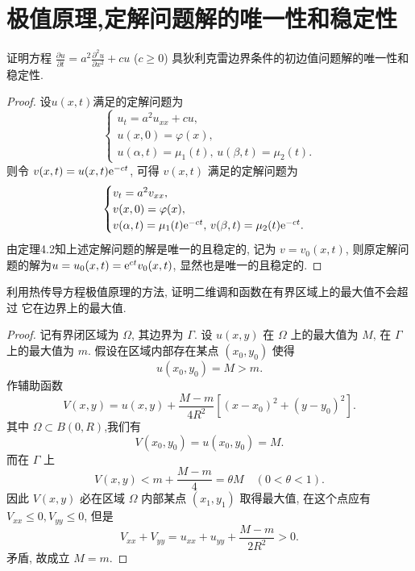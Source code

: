 \section{极值原理,定解问题解的唯一性和稳定性}

\begin{exercise}
  证明方程 $\frac{\partial u}{\partial t} = a^2 \frac{\partial^2 u}{\partial x^2} + cu$
  ($c\geq 0$) 具狄利克雷边界条件的初边值问题解的唯一性和稳定性.
\end{exercise}

\begin{proof}
  设$u(x,t)$满足的定解问题为
  \[\begin{cases}
    u_t = a^2 u_{xx} + cu, \\
    u(x,0) = \varphi(x), \\
    u(\alpha,t) = \mu_1(t),\,u(\beta,t)=\mu_2(t).
  \end{cases}\]
  则令 $v(x,t)=u(x,t) \mathrm{e}^{-ct}$, 可得 $v(x,t)$ 满足的定解问题为
  \[\begin{cases}
    v_t = a^2v_{xx}, \\
    v(x,0) = \varphi(x), \\
    v(\alpha,t) = \mu_1(t)\mathrm{e}^{-ct},\,v(\beta,t) = \mu_2(t)\mathrm{e}^{-ct}.
  \end{cases}\]
  由定理4.2知上述定解问题的解是唯一的且稳定的,
  记为 $v=v_0(x,t)$, 则原定解问题的解为$u = u_0(x,t) = \mathrm{e}^{ct}v_0(x,t)$, 显然也是唯一的且稳定的.
\end{proof}


\begin{exercise}
  利用热传导方程极值原理的方法, 证明二维调和函数在有界区域上的最大值不会超过
  它在边界上的最大值.
\end{exercise}

\begin{proof}
  记有界闭区域为 $\Omega$, 其边界为 $\Gamma$.
  设 $u(x,y)$ 在 $\Omega$ 上的最大值为 $M$, 在 $\Gamma$ 上的最大值为 $m$.
  假设在区域内部存在某点 $(x_0,y_0)$ 使得
  \[u(x_0,y_0) = M > m.\]
  作辅助函数
  \[V(x,y) = u(x,y)+\frac{M-m}{4R^2}\left[(x-x_0)^2+(y-y_0)^2\right].\]
  其中 $\Omega\subset B(0,R)$,我们有
  \[V(x_0,y_0)=u(x_0,y_0)=M.\]
  而在 $\Gamma$ 上
  \[V(x,y) < m+\frac{M-m}{4}=\theta M\quad (0<\theta<1).\]
  因此 $V(x,y)$ 必在区域 $\Omega$ 内部某点 $(x_1,y_1)$ 取得最大值,
  在这个点应有 $V_{xx}\leq0,V_{yy}\leq 0$, 但是
  \[V_{xx}+V_{yy}=u_{xx}+u_{yy}+\frac{M-m}{2R^2}>0.\]
  矛盾, 故成立 $M=m$.
\end{proof}


